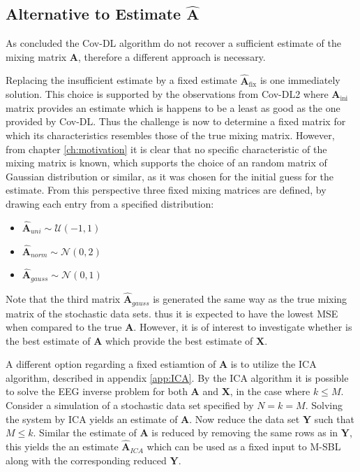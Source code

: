 \subsection{Alternative to Estimate $\hat{\textbf{A}}$}  
As concluded the Cov-DL algorithm do not recover a sufficient estimate of the mixing matrix $\mathbf{A}$, therefore a different approach is necessary. 

Replacing the insufficient estimate by a fixed estimate $\hat{\mathbf{A}}_{\text{fix}}$ is one immediately solution. 
This choice is supported by the observations from Cov-DL2 where $\mathbf{A}_{\text{ini}}$ matrix provides an estimate which is happens to be a least as good as the one provided by Cov-DL. 
Thus the challenge is now to determine a fixed matrix for which its characteristics resembles those of the true mixing matrix. 
However, from chapter \ref{ch:motivation} it is clear that no specific characteristic of the mixing matrix is known, which supports the choice of an random matrix of Gaussian distribution or similar, as it was chosen for the initial guess for the estimate.   
From this perspective three fixed mixing matrices are defined, by drawing each entry from a specified distribution: 
\begin{itemize}
\item[] $\hat{\textbf{A}}_{uni}\sim \mathcal{U}(-1,1)$
\item[] $\hat{\textbf{A}}_{norm}\sim \mathcal{N}(0, 2)$ 
\item[] $\hat{\textbf{A}}_{gauss}\sim \mathcal{N}(0,1)$                                           
\end{itemize}

Note that the third matrix $\hat{\textbf{A}}_{gauss}$ is generated the same way as the true mixing matrix of the stochastic data sets. thus it is expected to have the lowest MSE when compared to the true $\textbf{A}$. However, it is of interest to investigate whether is the best estimate of $\textbf{A}$ which provide the best estimate of $\textbf{X}$.   

A different option regarding a fixed estiamtion of $\textbf{A}$ is to utilize the ICA algorithm, described in appendix \ref{app:ICA}. By the ICA algorithm it is possible to solve the EEG inverse problem for both $\textbf{A}$ and $\textbf{X}$, in the case where $k \leq M$.
Consider a simulation of a stochastic data set specified by $N = k = M$. Solving the system by ICA yields an estimate of $\textbf{A}$. Now reduce the data set $\textbf{Y}$ such that $M \leq k$. Similar the estimate of $\textbf{A}$ is reduced by removing the same rows as in $\textbf{Y}$, this yields the an estimate $\hat{\textbf{A}}_{ICA}$ which can be used as a fixed input to M-SBL along with the corresponding reduced $\textbf{Y}$.

